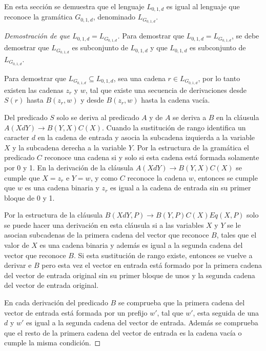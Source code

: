 \documentclass[12pt]{article}
\begin{document}
En esta sección se demuestra que el lenguaje $L_{0,1,d}$ es igual al lenguaje que reconoce la gramática $G_{0,1,d}$,
denominado $L_{G_{0,1,d}}$.

\begin{proof}[Demostración de que $L_{0,1,d}=L_{G_{0,1,d}}$]
    Para demostrar que $L_{0,1,d}=L_{G_{0,1,d}}$, se debe demostrar que $L_{G_{0,1,d}}$ es subconjunto de $L_{0,1,d}$ y que
    $L_{0,1,d}$ es subconjunto de $L_{G_{0,1,d}}$. 
    
    Para demostrar que $L_{G_{0,1,d}}\subseteq L_{0,1,d}$, sea una cadena $r\in L_{G_{0,1,d}}$, por lo tanto existen las cadenas
    $z_r$ y $w$, tal que existe una secuencia de derivaciones desde $S(r)$ hasta $B(z_r,w)$ y desde $B(z_r,w)$ hasta
    la cadena vacía.
    
    Del predicado $S$ solo se deriva al predicado $A$ y de $A$ se deriva a $B$ en la cláusula $A(XdY)\to B(Y,X)C(X)$.
    Cuando la sustitución de rango identifica un caracter $d$ en la cadena de entrada y asocia la subcadena izquierda a la 
    variable $X$ y la subcadena derecha a la variable $Y$. Por la estructura de la gramática el predicado $C$ reconoce
    una cadena si y solo si esta cadena está formada solamente por 0 y 1. En la derivación de la cláusula $A(XdY)\to B(Y,X)C(X)$
    se cumple que $X=z_r$ e $Y=w$, y como $C$ reconoce la cadena $w$, entonces se cumple que $w$ es una cadena binaria
    y $z_r$ es igual a la cadena de entrada sin su primer bloque de 0 y 1.
    
    Por la estructura de la cláusula $B(XdY,P)\to B(Y,P) C(X) Eq(X,P)$ solo se puede hacer una derivación en esta cláusula
    si a las variables $X$ y $Y$ se le asocian subcadenas de la primera cadena del vector que reconoce $B$, tales que 
    el valor de $X$ es una cadena binaria y además es igual a la segunda cadena del vector que reconoce $B$. Si esta sustitución
    de rango existe, entonces se vuelve a derivar e $B$ pero esta vez el vector en entrada está formado
    por la primera cadena del vector de entrada original sin su primer bloque de unos y la segunda cadena del vector
    de entrada original. 
    
    En cada derivación del predicado $B$ se comprueba que la primera cadena del vector de entrada está formada 
    por un prefijo $w'$, tal que $w'$, esta seguida de una $d$ y $w'$ es igual a la segunda cadena del vector de entrada. Además
    se comprueba que el resto de la primera cadena del vector de entrada es la cadena vacía o cumple la misma condición.
    

\end{proof}
\end{document}
